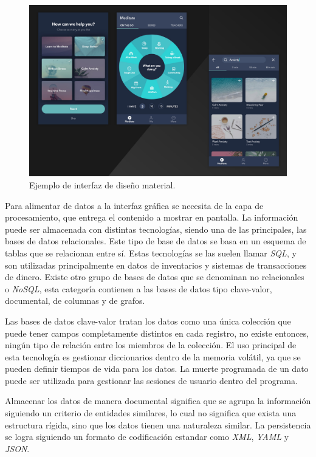 \begin{figure}[h]
	\centering
	\includegraphics[width=\textwidth]{./Figures/ch1MaterialDesign.jpg}
	\caption{Ejemplo de interfaz de diseño material. \citep{WEBSITE:Material}}
	\label{fig:ch1MaterialDesign}
\end{figure}

Para alimentar de datos a la interfaz gráfica se necesita de la capa de procesamiento, que entrega el contenido a mostrar en pantalla. La información puede ser almacenada con distintas tecnologías, siendo una de las principales, las bases de datos relacionales.
Este tipo de base de datos se basa en un esquema de tablas que se relacionan entre sí.
Estas tecnologías se las suelen llamar \emph{SQL}, y son utilizadas principalmente en datos de inventarios y sistemas de transacciones de dinero.
Existe otro grupo de bases de datos que se denominan no relacionales o \emph{NoSQL}, esta categoría contienen a las bases de datos tipo clave-valor, documental, de columnas y de grafos.

Las bases de datos clave-valor tratan los datos como una única colección que puede tener campos completamente distintos en cada registro, no existe entonces, ningún tipo de relación entre los miembros de la colección. El uso principal de esta tecnología es gestionar diccionarios dentro de la memoria volátil, ya que se pueden definir tiempos de vida para los datos. La muerte programada de un dato puede ser utilizada para gestionar las sesiones de usuario dentro del programa.

Almacenar los datos de manera documental significa que se agrupa la información siguiendo un criterio de entidades similares, lo cual no significa que exista una estructura rígida, sino que los datos tienen una naturaleza similar.
La persistencia se logra siguiendo un formato de codificación estandar como \emph{XML}, \emph{YAML} y \emph{JSON}.


